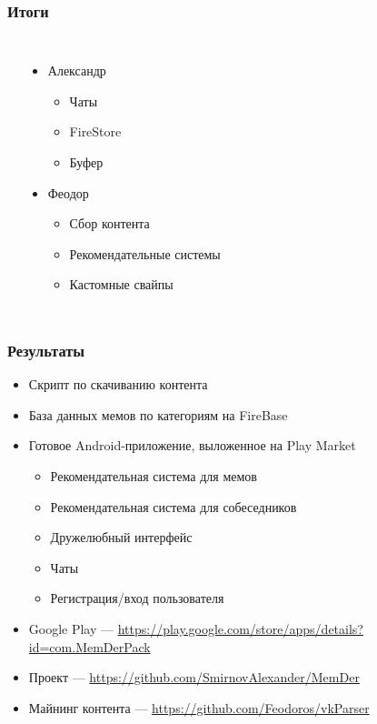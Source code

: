 \documentclass[xetex,mathserif,serif, xcolor=table]{beamer}
\begin{document}
	
	\begin{frame}
		\frametitle{Итоги}
		     \begin{columns}[t]
                    \begin{itemize}
        			\end{itemize}
                   \begin{itemize}
            			\item Александр
            			    \begin{itemize}
            			    	\item Чаты
            			    	\item FireStore
            			    	\item Буфер
            		        \end{itemize}
            			\item Феодор
            			    \begin{itemize}
            			    	\item Сбор контента
            			    	\item Рекомендательные системы  
            			    	\item Кастомные свайпы
		        \end{itemize}
		\end{itemize}
            \end{columns}		
	\end{frame}

	\begin{frame}
		\frametitle{Результаты}
		\begin{itemize}
		    \item Скрипт по скачиванию контента
			\item База данных мемов по категориям на FireBase
			\item Готовое Android-приложение, выложенное на Play Market
		    	\begin{itemize}
			    	\item Рекомендательная система для мемов
			    	\item Рекомендательная система для собеседников
			    	\item Дружелюбный интерфейс
			    	\item Чаты
			    	\item Регистрация/вход пользователя
			   	\end{itemize}
			\item Google Play — \url{https://play.google.com/store/apps/details?id=com.MemDerPack}
			\item Проект — \url{https://github.com/SmirnovAlexander/MemDer}
			\item Майнинг контента — \url{https://github.com/Feodoros/vkParser}
		\end{itemize}
	\end{frame}
\end{document}
